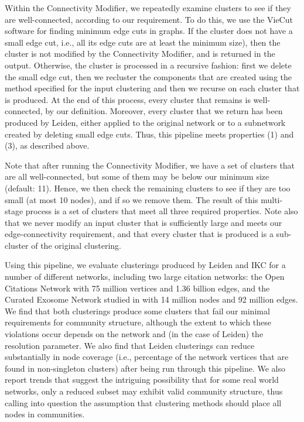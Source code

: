 \documentclass[11pt]{article}   	%
\begin{document}
Within the Connectivity Modifier, we repeatedly examine clusters to see if they are well-connected, according to our requirement.
To do this, we use the VieCut \citep{Henzinger2018,Henzinger2019}  software for finding minimum edge cuts in graphs.
If the cluster does not have a small edge cut, i.e., all its edge cuts are at least the minimum size), then the cluster is not modified by the Connectivity Modifier,
and is returned in the output.
Otherwise, the cluster is processed in a recursive fashion: first we delete the small edge cut, then we recluster the components that are created using the method specified for the input clustering
and then we recurse on each cluster that is produced. At the end of this process, every cluster that remains is well-connected, by our definition.
Moreover, every cluster that we return has been produced by Leiden, either applied to the original network or to a subnetwork created by deleting small edge cuts.
Thus, this pipeline meets properties (1) and (3), as  described above.

Note that after running the Connectivity Modifier, we have a set of clusters that are all well-connected, but some of them may be below our minimum size (default: 11).
Hence, we then check the remaining clusters to see if they are too small (at most 10 nodes), and if so we remove them.
The result of this multi-stage process is a set of clusters that meet all three required properties.
Note also that we never modify an input cluster that is sufficiently large
and meets our edge-connectivity requirement, and that every cluster that is produced is a sub-cluster of the original clustering.

Using this pipeline, we evaluate clusterings produced by Leiden and IKC for a number of different networks, including two large citation networks: the Open Citations Network with 75 million vertices and 1.36 billion edges, and the Curated Exosome Network studied 
in \cite{Jakatdar_2022} with 14 million nodes and 92 million edges.
We find that both clusterings produce  some clusters that  fail our minimal requirements for community structure, although the extent to which these violations occur depends on the network and (in the case of Leiden) the resolution parameter. 
We also find that Leiden clusterings can reduce substantially  in node coverage (i.e., percentage of the network vertices that are found in non-singleton
clusters)  after being run through this pipeline.
We also report trends that suggest the intriguing possibility that for some  real world networks, only a reduced subset may exhibit valid community structure,
thus calling into question the assumption that  clustering methods should place all nodes in communities. 
\end{document}
